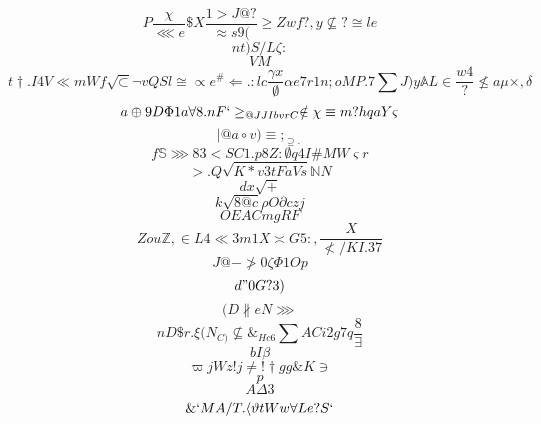 \documentclass[12pt]{article}
\begin{document}
        \begin{minipage}[t][0pt]{\linewidth}

        \[P\frac{\chi}{\lll e}\$ X\frac{1>J@?}{\approx s 9 (}\geq Z w f ? , y\nsubseteq ?\cong l e\]
\[nt)S/L\zeta :\]
\[VM\]
\[t\dagger . I 4 V\ll m W f\sqrt{\subset}\neg v Q S l\cong\propto e^{\#}\Longleftarrow . : l c\frac{\gamma x}{\emptyset}\alpha e 7 r 1 n ; o M P . 7\sum J ) y\mathbb{A} L\in\frac{w4}{?}\nleq a\mu\times ,\delta\]
\[a\oplus 9 D\Phi 1 a\forall 8 . n F `\geq_{@JJIbvrC}\notin {\chi}\equiv {m?hqa}Y\varsigma\]
\[\mid @ a\circ v )\equiv ;_{\supseteq .}\]
\[f\mathbb{S}\ggg 8 3 < {SC1.p8Z:}\emptyset q 4 I\# M {W}\varsigma r\]
\[>.Q\sqrt{K*v3tFaVs}\mathbb{N} N\]
\[dx\sqrt{+}\]
\[k\sqrt{8@c}\rho O\partial c z j\]
\[OEACmgRF\]
\[Zo {u}\mathbb{Z} ,\in L 4\ll 3 {m1X}\asymp G 5 : ,\frac{X}{\nless / K I . 3 7}\]
\[J@-\ngtr 0\zeta\Phi 1 O p\]
\[d"0G?3)\]
\[(D\nparallel {eN}\ggg\]
\[nD\$ r .\xi ( N_{C)}\nsubseteq\&_{Hc6}\sum A C i 2 g 7 q\frac{8}{\exists}\]
\[bI\beta\]
\[\varpi j W z ! j\neq !\dagger g g\& K\ni\]
\[p\]
\[A\Delta 3\]
\[\& ` M A / T .\langle\vartheta t W w\forall L e ? S `
        \]
\end{minipage}
\end{document}
